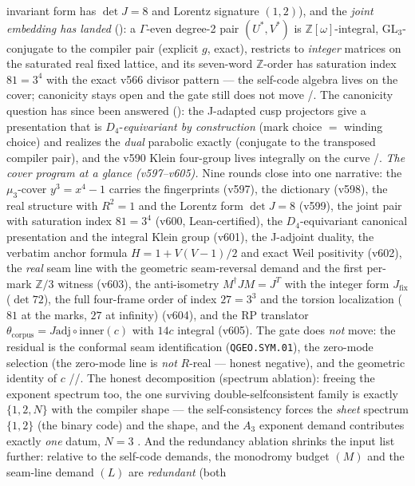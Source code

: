 \begin{keybox}
invariant form has $\det J=8$ and Lorentz signature $(1,2)$), and the
\emph{joint embedding has landed}
(): a $\Gamma$-even degree-2 pair
$(U^*,V^*)$ is $\mathbb{Z}[\omega]$-integral, GL$_3$-conjugate to the
compiler pair (explicit $g$, exact), restricts to \emph{integer}
matrices on the saturated real fixed lattice, and its seven-word
$\mathbb{Z}$-order has saturation index $81=3^4$ with the exact v566
divisor pattern --- the self-code algebra lives on the cover;
canonicity stays open and the gate still does not move \mE/\mC.  The
canonicity question has since been answered
(): the J-adapted cusp projectors
give a presentation that is $D_4$-\emph{equivariant by construction}
(mark choice $=$ winding choice) and realizes the \emph{dual}
parabolic exactly (conjugate to the transposed compiler pair), and
the v590 Klein four-group lives integrally on the curve \mE/\mC.
\emph{The cover program at a glance (v597--v605).}  Nine rounds close
into one narrative: the $\mu_3$-cover $y^3=x^4-1$ carries the
fingerprints (v597), the dictionary (v598), the real structure with
$R^2{=}1$ and the Lorentz form $\det J=8$ (v599), the joint pair with
saturation index $81=3^4$ (v600, Lean-certified), the
$D_4$-equivariant canonical presentation and the integral Klein group
(v601), the J-adjoint duality, the verbatim anchor formula
$H=1+V(V-1)/2$ and exact Weil positivity (v602), the \emph{real} seam
line with the geometric seam-reversal demand and the first per-mark
$\mathbb{Z}/3$ witness (v603), the anti-isometry
$M^\dagger JM=J^T$ with the integer form $J_{\mathrm{fix}}$
($\det 72$), the full four-frame order of index $27=3^3$ and the
torsion localization ($81$ at the marks, $27$ at infinity) (v604),
and the RP translator
$\theta_{\mathrm{corpus}}=J\mathrm{adj}\circ\mathrm{inner}(c)$ with
$14c$ integral (v605).  The gate does \emph{not} move: the residual
is the conformal seam identification (\texttt{QGEO.SYM.01}), the
zero-mode selection (the zero-mode line is \emph{not} $R$-real ---
honest negative), and the geometric identity of $c$ \mE/\mC/\mO.
The honest decomposition (spectrum ablation): freeing
the exponent spectrum too, the one surviving double-selfconsistent
family is exactly $\{1,2,N\}$ with the compiler shape --- the
self-consistency forces the \emph{sheet} spectrum $\{1,2\}$ (the binary
code) and the shape, and the $A_3$ exponent demand contributes exactly
\emph{one} datum, $N=3$ \mE.  And the redundancy ablation shrinks the
input list further: relative to the self-code demands, the monodromy
budget $(M)$ and the seam-line demand $(L)$ are \emph{redundant} (both

\end{keybox}
